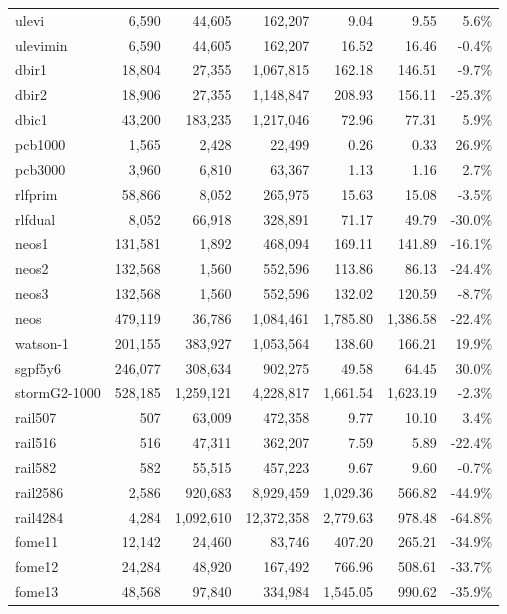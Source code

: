 \begin{small}
\begin{longtable}{|l|rrr|r|r|r|}
ulevi    &   6,590 &   44,605 &   162,207 &    9.04 &    9.55 &   5.6\% \\
ulevimin &   6,590 &   44,605 &   162,207 &   16.52 &   16.46 &  -0.4\% \\
dbir1    &  18,804 &   27,355 & 1,067,815 &  162.18 &  146.51 &  -9.7\% \\
dbir2    &  18,906 &   27,355 & 1,148,847 &  208.93 &  156.11 & -25.3\% \\
dbic1    &  43,200 &  183,235 & 1,217,046 &   72.96 &   77.31 &   5.9\% \\
pcb1000  &   1,565 &    2,428 &    22,499 &    0.26 &    0.33 &  26.9\% \\
pcb3000  &   3,960 &    6,810 &    63,367 &    1.13 &    1.16 &   2.7\% \\
rlfprim  &  58,866 &    8,052 &   265,975 &   15.63 &   15.08 &  -3.5\% \\
rlfdual  &   8,052 &   66,918 &   328,891 &   71.17 &   49.79 & -30.0\% \\
neos1    & 131,581 &    1,892 &   468,094 &  169.11 &  141.89 & -16.1\% \\
neos2    & 132,568 &    1,560 &   552,596 &  113.86 &   86.13 & -24.4\% \\
neos3    & 132,568 &    1,560 &   552,596 &  132.02 &  120.59 &  -8.7\% \\
neos     & 479,119 &   36,786 & 1,084,461 &1,785.80 &1,386.58 & -22.4\% \\
watson-1 & 201,155 &  383,927 & 1,053,564 &  138.60 &  166.21 &  19.9\% \\
sgpf5y6  & 246,077 &  308,634 &   902,275 &   49.58 &   64.45 &  30.0\% \\
stormG2-1000 & 528,185 & 1,259,121 & 4,228,817 & 1,661.54 & 1,623.19 & -2.3\%\\
rail507  &     507 &   63,009 &   472,358 &    9.77 &   10.10 &   3.4\% \\
rail516  &     516 &   47,311 &   362,207 &    7.59 &    5.89 & -22.4\% \\
rail582  &     582 &   55,515 &   457,223 &    9.67 &    9.60 &  -0.7\% \\
rail2586 &   2,586 &  920,683 & 8,929,459 &1,029.36 &  566.82 & -44.9\% \\
rail4284 &   4,284 &1,092,610 &12,372,358 &2,779.63 &  978.48 & -64.8\% \\
fome11   &  12,142 &   24,460 &    83,746 &  407.20 &  265.21 & -34.9\% \\
fome12   &  24,284 &   48,920 &   167,492 &  766.96 &  508.61 & -33.7\% \\
fome13   &  48,568 &   97,840 &   334,984 & 1,545.05 & 990.62 & -35.9\% \\
\end{longtable} 
\end{small}

